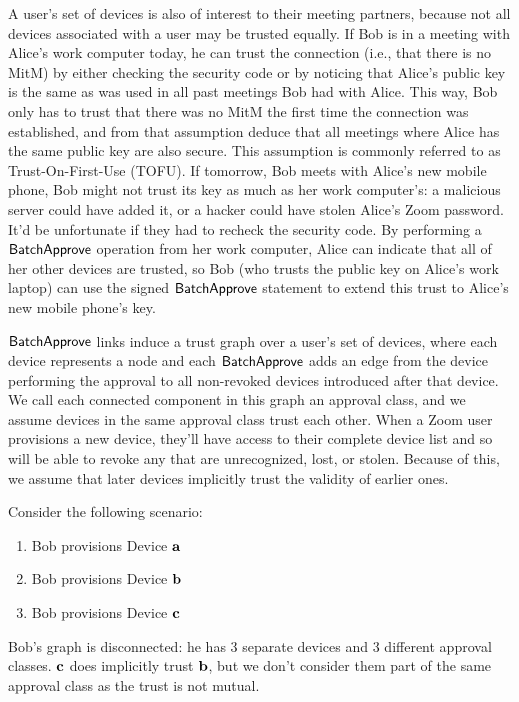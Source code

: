 A user’s set of devices is also of interest to their meeting partners, because not all devices
associated with a user may be trusted equally. If Bob is in a meeting with Alice's work computer
today, he can trust the connection (i.e., that there is no MitM) by either checking the
security code or by noticing that Alice’s public key is the same as was used in all past meetings
Bob had with Alice. This way, Bob only has to trust that there was no MitM the first time the
connection was established, and from that assumption deduce that all meetings where Alice has the
same public key are also secure. This assumption is commonly referred to as Trust-On-First-Use
(TOFU). If tomorrow, Bob meets with Alice's new mobile phone, Bob might not trust its key as much as
her work computer’s: a malicious server could have added it, or a hacker could have stolen Alice's
Zoom password. It'd be unfortunate if they had to recheck the security code. By performing
a $\mathsf{BatchApprove}{}$ operation from her work computer, Alice can indicate that all of her other
devices are trusted, so Bob (who trusts the public key on Alice’s work laptop) can use the signed
$\mathsf{BatchApprove}{}$ statement to extend this trust to Alice's new mobile phone’s key.

$\mathsf{BatchApprove}{}$ links induce a trust graph over a user's set of devices, where each device
represents a node and each $\mathsf{BatchApprove}{}$ adds an edge from the device performing the approval to
all non-revoked devices introduced after that device. We call each connected component in this graph
an approval class, and we assume devices in the same approval class trust each other. When a Zoom user
provisions a new device, they'll have access to their complete device list and so will be able to
revoke any that are unrecognized, lost, or stolen. Because of this, we assume that later devices
implicitly trust the validity of earlier ones.

Consider the following scenario:
\begin{enumerate}
\item Bob provisions Device $\mathbf{a}$
\item Bob provisions Device $\mathbf{b}$
\item Bob provisions Device $\mathbf{c}$
\end{enumerate}

Bob's graph is disconnected: he has 3 separate devices and 3 different approval classes. $\mathbf{c}$
does implicitly trust $\mathbf{b}$, but we don't consider them part of the same approval class as the
trust is not mutual.

